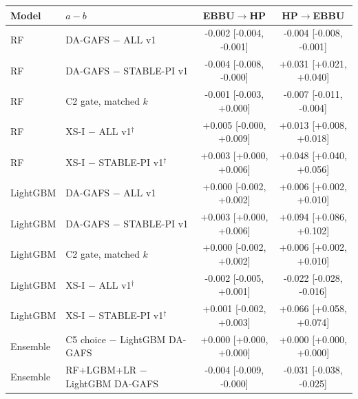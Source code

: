 \begin{tabular}{llcc}
\toprule
Model & $a-b$ & EBBU$\rightarrow$HP & HP$\rightarrow$EBBU \\
\midrule
RF & DA-GAFS $-$ ALL v1 & -0.002 [-0.004, -0.001] & -0.004 [-0.008, -0.001] \\
RF & DA-GAFS $-$ STABLE-PI v1 & -0.004 [-0.008, -0.000] & +0.031 [+0.021, +0.040] \\
RF & C2 gate, matched $k$ & -0.001 [-0.003, +0.000] & -0.007 [-0.011, -0.004] \\
RF & XS-I $-$ ALL v1$^\dagger$ & +0.005 [-0.000, +0.009] & +0.013 [+0.008, +0.018] \\
RF & XS-I $-$ STABLE-PI v1$^\dagger$ & +0.003 [+0.000, +0.006] & +0.048 [+0.040, +0.056] \\
\midrule
LightGBM & DA-GAFS $-$ ALL v1 & +0.000 [-0.002, +0.002] & +0.006 [+0.002, +0.010] \\
LightGBM & DA-GAFS $-$ STABLE-PI v1 & +0.003 [+0.000, +0.006] & +0.094 [+0.086, +0.102] \\
LightGBM & C2 gate, matched $k$ & +0.000 [-0.002, +0.002] & +0.006 [+0.002, +0.010] \\
LightGBM & XS-I $-$ ALL v1$^\dagger$ & -0.002 [-0.005, +0.001] & -0.022 [-0.028, -0.016] \\
LightGBM & XS-I $-$ STABLE-PI v1$^\dagger$ & +0.001 [-0.002, +0.003] & +0.066 [+0.058, +0.074] \\
\midrule
Ensemble & C5 choice $-$ LightGBM DA-GAFS & +0.000 [+0.000, +0.000] & +0.000 [+0.000, +0.000] \\
Ensemble & RF+LGBM+LR $-$ LightGBM DA-GAFS & -0.004 [-0.009, -0.000] & -0.031 [-0.038, -0.025] \\
\bottomrule
\end{tabular}
